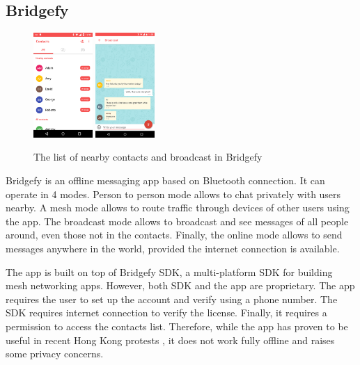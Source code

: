 \documentclass[conference,compsoc]{IEEEtran}
\begin{document}
\subsection{Bridgefy}

\begin{figure}[h]
  \centering
  \includegraphics[width=0.2\textwidth]{bridgefy1}
  \includegraphics[width=0.2\textwidth]{bridgefy2}
  \caption{The list of nearby contacts and broadcast in Bridgefy \cite{bridgefy_gplay}}
\end{figure}

Bridgefy is an offline messaging app based on Bluetooth connection. It can operate in 4 modes. Person to person mode allows to chat privately with users nearby. A mesh mode allows to route traffic through devices of other users using the app. The broadcast mode allows to broadcast and see messages of all people around, even those not in the contacts. Finally, the online mode allows to send messages anywhere in the world, provided the internet connection is available.

The app is built on top of Bridgefy SDK, a multi-platform SDK for building mesh networking apps. However, both SDK and the app are proprietary. The app requires the user to set up the account and verify using a phone number. The SDK requires internet connection to verify the license. Finally, it requires a permission to access the contacts list. Therefore, while the app has proven to be useful in recent Hong Kong protests \cite{forbes:hk}, it does not work fully offline and raises some privacy concerns.
\end{document}
